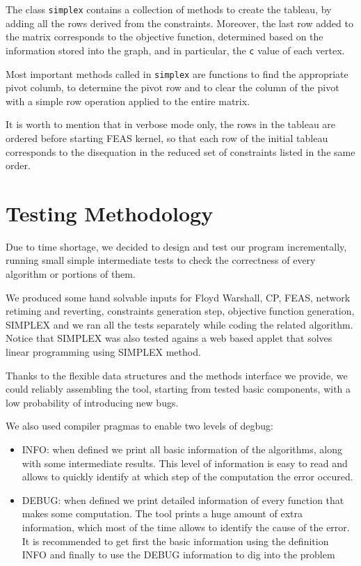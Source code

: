\documentclass{acm_proc_article-sp}
\begin{document}
The class \texttt{simplex} contains a collection of methods to create the tableau,
by adding all the rows derived from the constraints. Moreover, the last row added
to the matrix corresponds to the objective function, determined based on the
information stored into the graph, and in particular, the \texttt{c} value of
each vertex.

Most important methods called in \texttt{simplex} are functions to find the
appropriate pivot columb, to determine the pivot row and to clear the column
of the pivot with a simple row operation applied to the entire matrix.

It is worth to mention that in verbose mode only, the rows in the tableau are
ordered before starting FEAS kernel, so that each row of the initial tableau
corresponds to the disequation in the reduced set of constraints listed in the
same order.


\section{Testing Methodology}

Due to time shortage, we decided to design and test our program
incrementally, running small simple intermediate tests to check the correctness
of every algorithm or portions of them.

We produced some hand solvable inputs for Floyd Warshall, CP, FEAS, network
retiming and reverting, constraints generation step, objective function generation,
SIMPLEX and we ran all the tests separately while coding the related algorithm.
Notice that SIMPLEX was also tested agains a web based applet that solves
linear programming using SIMPLEX method.

Thanks to the flexible data structures and the methods interface we provide, we
could reliably assembling the tool, starting from tested basic components,
with a low probability of introducing new bugs.

We also used compiler pragmas to enable two levels of degbug:
\begin{itemize}
 \item {INFO}: when defined we print all basic information of the algorithms,
   along with some intermediate results. This level of information is easy to read
   and allows to quickly identify at which step of the computation the error
   occured.
 \item {DEBUG}: when defined we print detailed information of every function
   that makes some computation. The tool prints a huge amount of extra information,
   which most of the time allows to identify the cause of the error. It is
   recommended to get first the basic information using the definition INFO
   and finally to use the DEBUG information to dig into the problem
\end{itemize}
\end{document}

